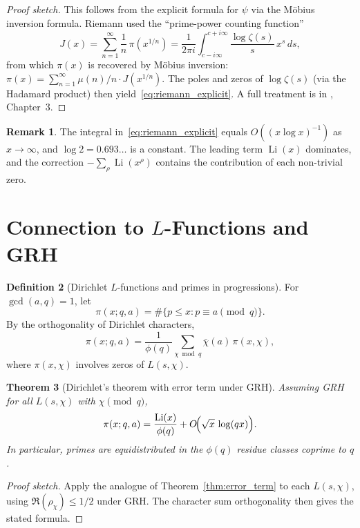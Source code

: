 \documentclass[12pt,a4paper]{amsart}
\newtheorem{theorem}{Theorem}[section]
\theoremstyle{definition}
\newtheorem{definition}[theorem]{Definition}
\newtheorem{remark}[theorem]{Remark}
\DeclareMathOperator{\Li}{Li}
\begin{document}
\begin{proof}[Proof sketch]
This follows from the explicit formula for $\psi$ via the M\"obius
inversion formula.  Riemann used the ``prime-power counting function''
\[
  J(x) = \sum_{n=1}^{\infty} \frac{1}{n}\,\pi(x^{1/n})
  = \frac{1}{2\pi i}\int_{c-i\infty}^{c+i\infty} \frac{\log\zeta(s)}{s}\,x^s\,ds,
\]
from which $\pi(x)$ is recovered by M\"obius inversion:
$\pi(x) = \sum_{n=1}^\infty \mu(n)/n \cdot J(x^{1/n})$.
The poles and zeros of $\log\zeta(s)$ (via the Hadamard product)
then yield~\eqref{eq:riemann_explicit}.
A full treatment is in \cite{Titchmarsh1986}, Chapter~3.
\end{proof}

\begin{remark}
The integral in~\eqref{eq:riemann_explicit} equals $O\!\left((x\log x)^{-1}\right)$
as $x \to \infty$, and $\log 2 = 0.693\ldots$ is a constant.  The leading
term $\Li(x)$ dominates, and the correction $-\sum_\rho \Li(x^\rho)$ contains
the contribution of each non-trivial zero.
\end{remark}

\section{Connection to \texorpdfstring{$L$}{L}-Functions and GRH}

\begin{definition}[Dirichlet $L$-functions and primes in progressions]
\label{def:pnt_progressions}
For $\gcd(a, q) = 1$, let
\[
  \pi(x; q, a) = \#\{p \le x : p \equiv a \pmod q\}.
\]
By the orthogonality of Dirichlet characters,
\[
  \pi(x; q, a) = \frac{1}{\phi(q)}\sum_{\chi \bmod q} \bar\chi(a)\,
  \pi(x, \chi),
\]
where $\pi(x, \chi)$ involves zeros of $L(s, \chi)$.
\end{definition}

\begin{theorem}[Dirichlet's theorem with error term under GRH]
\label{thm:dirichlet_grh}
Assuming GRH for all $L(s, \chi)$ with $\chi \pmod q$,
\[
  \pi(x; q, a) = \frac{\Li(x)}{\phi(q)}
  + O\!\Bigl(\sqrt{x}\,\log(qx)\Bigr).
\]
In particular, primes are equidistributed in the $\phi(q)$ residue classes
coprime to $q$.
\end{theorem}

\begin{proof}[Proof sketch]
Apply the analogue of Theorem~\ref{thm:error_term} to each $L(s, \chi)$,
using $\Re(\rho_\chi) \le 1/2$ under GRH.  The character sum orthogonality
then gives the stated formula.
\end{proof}
\end{document}
